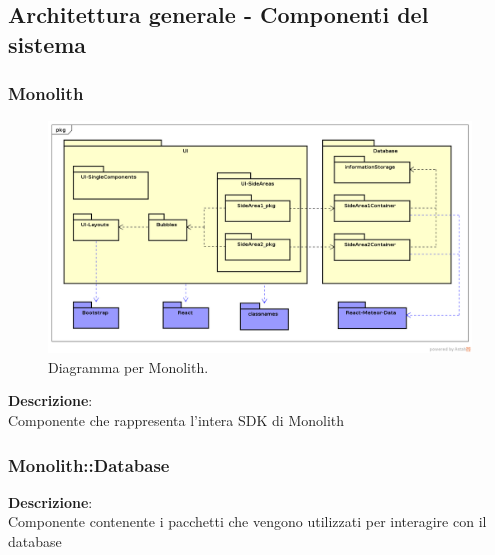 \subsection{Architettura generale - Componenti del sistema}
\subsubsection{Monolith}
   \FloatBarrier
   \begin{figure}[ht]
   \centering
\includegraphics[width=\textwidth,keepaspectratio]{img/General}
   \caption{Diagramma per Monolith.}
\end{figure}
\FloatBarrier
\textbf{Descrizione}:\\
 Componente che rappresenta l'intera SDK di Monolith 


\clearpage

\subsubsection{Monolith::Database}
\textbf{Descrizione}:\\
 Componente contenente i pacchetti che vengono utilizzati per interagire con il database 


\clearpage

